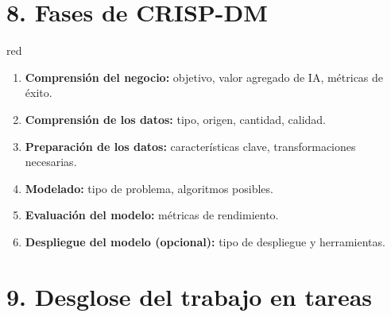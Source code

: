 \documentclass[
11pt, %
]{charter}
\begin{document}
\section{8. Fases de CRISP-DM}

\begin{consigna}{red} %

\begin{enumerate}
  \item \textbf{Comprensión del negocio:} objetivo, valor agregado de IA, métricas de éxito.
  \item \textbf{Comprensión de los datos:} tipo, origen, cantidad, calidad.
  \item \textbf{Preparación de los datos:} características clave, transformaciones necesarias.
  \item \textbf{Modelado:} tipo de problema, algoritmos posibles.
  \item \textbf{Evaluación del modelo:} métricas de rendimiento.
  \item \textbf{Despliegue del modelo (opcional):} tipo de despliegue y herramientas.
\end{enumerate}

\end{consigna} %


\section{9. Desglose del trabajo en tareas}
\label{sec:wbs}
\end{document}
